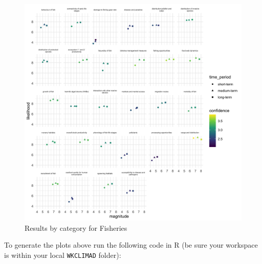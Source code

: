 \documentclass[
]{article}
\begin{document}
\begin{figure}
\centering
\includegraphics[width=1\textwidth,height=\textheight]{Figs/plot_all_fish.png}
\caption{Results by category for Fisheries}
\end{figure}

To generate the plots above run the following code in R (be sure your
workspace is within your local \texttt{WKCLIMAD} folder):
\end{document}

